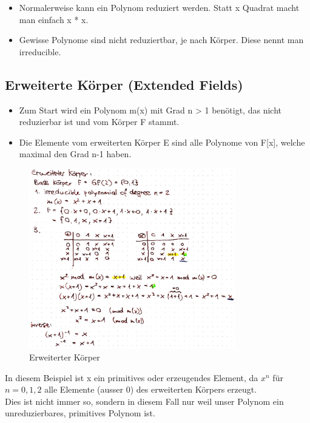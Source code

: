 \begin{itemize}
\tightlist
\item
  Normalerweise kann ein Polynom reduziert werden. Statt x Quadrat macht man einfach x * x.
\item
  Gewisse Polynome sind nicht reduziertbar, je nach Körper. Diese nennt man irreducible.
\end{itemize}

\hypertarget{erweiterte-kuxf6rper-extended-fields}{%
\subsection{Erweiterte Körper (Extended
Fields)}\label{erweiterte-kuxf6rper-extended-fields}}

\begin{itemize}
\tightlist
\item
  Zum Start wird ein Polynom m(x) mit Grad n \textgreater{} 1 benötigt,
  das nicht reduzierbar ist und vom Körper F stammt.
\item
  Die Elemente vom erweiterten Körper E sind alle Polynome von F{[}x{]},
  welche maximal den Grad n-1 haben.
\end{itemize}

\begin{figure}[H]
\centering
\includegraphics[width=0.8\textwidth]{figures/erweiterterKoerper.png}
\caption{Erweiterter Körper}
\end{figure}

In diesem Beispiel ist x ein primitives oder erzeugendes Element, da
$x^n$ für $n = 0,1,2$ alle Elemente (ausser 0) des erweiterten Körpers
erzeugt.\\
Dies ist nicht immer so, sondern in diesem Fall nur weil unser Polynom
ein unreduzierbares, primitives Polynom ist.

